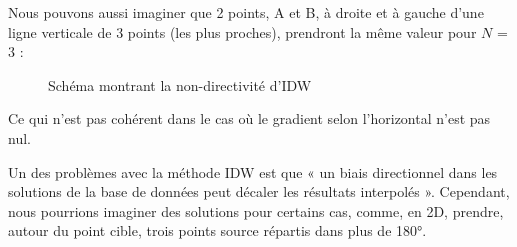 Nous pouvons aussi imaginer que 2 points, A et B, à droite et à gauche d'une ligne verticale de 3 points (les plus proches), prendront la même valeur pour \( N \) = 3 :

\begin{figure}[H]
    \centering
    
    \caption{Schéma montrant la non-directivité d'IDW}
\end{figure}

    
Ce qui n'est pas cohérent dans le cas où le gradient selon l'horizontal n'est pas nul.

Un des problèmes avec la méthode IDW est que « un biais directionnel dans les solutions de la base de données peut décaler les résultats interpolés »\cite{palmer2009}\cite{idw-mapscaping}. Cependant, nous pourrions imaginer des solutions pour certains cas, comme, en 2D, prendre, autour du point cible, trois points source répartis dans plus de 180°.\cite{idw-update}  %


